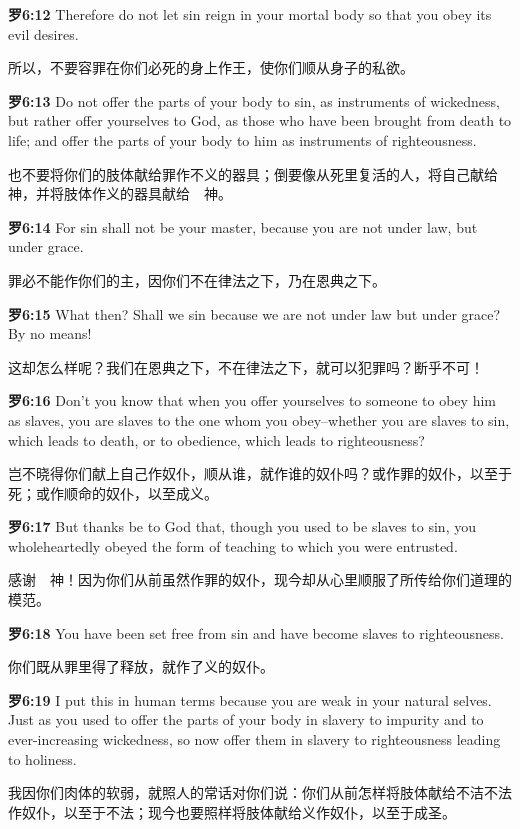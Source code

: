 \documentclass[a4paper,11pt,onecolumn,twoside]{ctexart}
\begin{document}
\begin{multicols}{2}
 \textbf{罗6:12}
 Therefore do not let sin reign in your mortal body so that you obey its evil desires.

 所以，不要容罪在你们必死的身上作王，使你们顺从身子的私欲。


 \textbf{罗6:13}
 Do not offer the parts of your body to sin, as instruments of wickedness, but rather offer yourselves to God, as those who have been brought from death to life; and offer the parts of your body to him as instruments of righteousness.

 也不要将你们的肢体献给罪作不义的器具；倒要像从死里复活的人，将自己献给　神，并将肢体作义的器具献给　神。


 \textbf{罗6:14}
 For sin shall not be your master, because you are not under law, but under grace.

 罪必不能作你们的主，因你们不在律法之下，乃在恩典之下。


 \textbf{罗6:15}
 What then? Shall we sin because we are not under law but under grace? By no means!

 这却怎么样呢？我们在恩典之下，不在律法之下，就可以犯罪吗？断乎不可！


 \textbf{罗6:16}
 Don't you know that when you offer yourselves to someone to obey him as slaves, you are slaves to the one whom you obey--whether you are slaves to sin, which leads to death, or to obedience, which leads to righteousness?

 岂不晓得你们献上自己作奴仆，顺从谁，就作谁的奴仆吗？或作罪的奴仆，以至于死；或作顺命的奴仆，以至成义。


 \textbf{罗6:17}
 But thanks be to God that, though you used to be slaves to sin, you wholeheartedly obeyed the form of teaching to which you were entrusted.

 感谢　神！因为你们从前虽然作罪的奴仆，现今却从心里顺服了所传给你们道理的模范。


 \textbf{罗6:18}
 You have been set free from sin and have become slaves to righteousness.

 你们既从罪里得了释放，就作了义的奴仆。


 \textbf{罗6:19}
 I put this in human terms because you are weak in your natural selves. Just as you used to offer the parts of your body in slavery to impurity and to ever-increasing wickedness, so now offer them in slavery to righteousness leading to holiness.

 我因你们肉体的软弱，就照人的常话对你们说：你们从前怎样将肢体献给不洁不法作奴仆，以至于不法；现今也要照样将肢体献给义作奴仆，以至于成圣。



\end{multicols}
\end{document}
